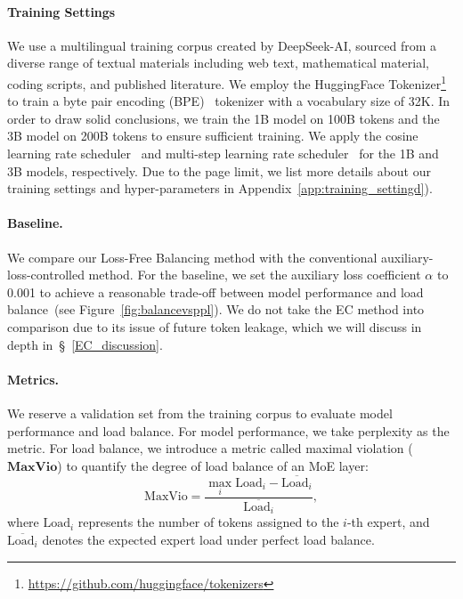 \documentclass{article} %
\newcommand{\ours}{Loss-Free Balancing}
\begin{document}
\paragraph{Training Settings}
We use a multilingual training corpus created by DeepSeek-AI, sourced from a diverse range of textual materials including web text, mathematical material, coding scripts, and published
literature.
We employ the HuggingFace Tokenizer\footnote{\url{https://github.com/huggingface/tokenizers}} to train a byte pair encoding (BPE)~\citep{Sennrich2015NeuralMT} tokenizer with a vocabulary size of 32K. 
In order to draw solid conclusions, we train the 1B model on 100B tokens and the 3B model on 200B tokens to ensure sufficient training. 
We apply the cosine learning rate scheduler~\citep{Loshchilov2016SGDRSG} and multi-step learning rate scheduler~\citep{Dai2024DeepSeekMoETU} for the 1B and 3B models, respectively. 
Due to the page limit, we list more details about our training settings and hyper-parameters in Appendix~\ref{app:training_settingd}).

\paragraph{Baseline.}
We compare our \ours{} method with the conventional auxiliary-loss-controlled method. 
For the baseline, we set the auxiliary loss coefficient $\alpha$ to 0.001 to achieve a reasonable trade-off between model performance and load balance~(see Figure~\ref{fig:balancevsppl}). 
We do not take the EC method into comparison due to its issue of future token leakage, which we will discuss in depth in~\S~\ref{EC_discussion}.

\paragraph{Metrics.}
\label{subsec:metrics}
We reserve a validation set from the training corpus to evaluate model performance and load balance. 
For model performance, we take perplexity as the metric. 
For load balance, we introduce a metric called maximal violation ($\textbf{MaxVio}$) to quantify the degree of load balance of an MoE layer: 
\begin{equation}
    \text{MaxVio} = \frac{\max_i \text{Load}_{i} - \overline{\text{Load}_{i}}}{\overline{\text{Load}_{i}}},
\end{equation}
where $\text{Load}_{i}$ represents the number of tokens assigned to the $i$-th expert, and $\overline{\text{Load}_{i}}$ denotes the expected expert load under perfect load balance. 
\end{document}
